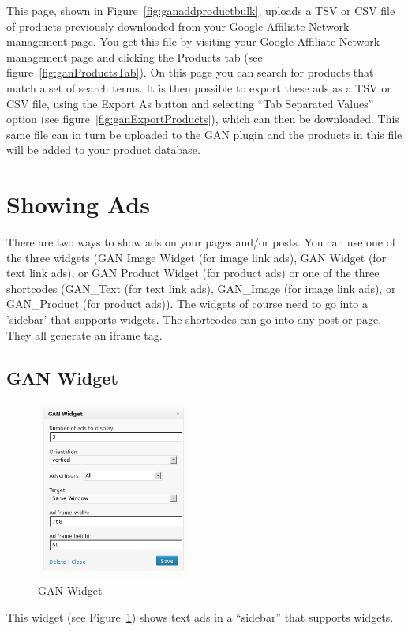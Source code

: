 \documentclass[letterpaper]{article}
\begin{document}
This page, shown in Figure~\ref{fig:ganaddproductbulk}, uploads a TSV
or CSV file of products previously downloaded from your Google Affiliate
Network management page. You get this file by visiting your Google
Affiliate Network management page and clicking the Products tab (see
figure~\ref{fig:ganProductsTab}). On this page you can search for
products that match a set of search terms. It is then possible to export
these ads as a TSV or CSV file, using the Export As button and selecting ``Tab
Separated Values'' option (see figure~\ref{fig:ganExportProducts}),
which can then be downloaded. This same file can in turn be uploaded to
the GAN plugin and the products in this file will be added to your product
database.

\section{Showing Ads}

There are two ways to show ads on your pages and/or posts.  You can use
one of the three widgets (GAN Image Widget (for image link ads), GAN
Widget (for text link ads), or GAN Product Widget (for product ads) or
one of the three shortcodes (GAN\_Text (for text link ads), GAN\_Image
(for image link ads), or GAN\_Product (for product ads)).  The widgets
of course need to go into a 'sidebar' that supports widgets.  The
shortcodes can go into any post or page.  They all generate an iframe
tag.

\subsection{GAN Widget}

\begin{figure}[ht]
\begin{centering}
\includegraphics[width=2in]{ganwidget.png}
\caption{GAN Widget}
\label{fig:ganwidget}
\end{centering}
\end{figure}
This widget (see Figure~\ref{fig:ganwidget}) shows text ads in a
``sidebar'' that supports widgets.
\end{document}
